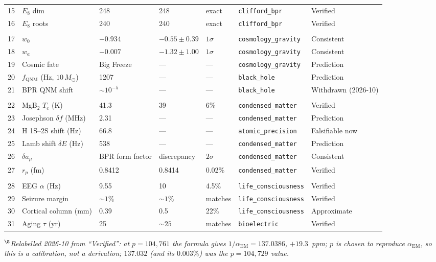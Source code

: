 \documentclass[aps,prd,twocolumn,superscriptaddress,longbibliography,nofootinbib]{revtex4-2}
\newcommand{\alphaEM}{\alpha_{\mathrm{EM}}}
\begin{document}
\begin{table}[t]
\begin{ruledtabular}
\begin{tabular}{rllllll}
15 & $E_8$ dim & 248 & 248 & exact &
   \texttt{clifford\_bpr} & Verified \\
16 & $E_8$ roots & 240 & 240 & exact &
   \texttt{clifford\_bpr} & Verified \\
\colrule
\multicolumn{7}{c}{\textit{Cosmology}} \\
17 & $w_0$ & $-0.934$ & $-0.55 \pm 0.39$ & $1\sigma$ &
   \texttt{cosmology\_gravity} & Consistent \\
18 & $w_a$ & $-0.007$ & $-1.32 \pm 1.00$ & $1\sigma$ &
   \texttt{cosmology\_gravity} & Consistent \\
19 & Cosmic fate & Big Freeze & --- & --- &
   \texttt{cosmology\_gravity} & Prediction \\
20 & $f_{\mathrm{QNM}}$ (Hz, $10\,M_\odot$) & 1207 & --- & --- &
   \texttt{black\_hole} & Prediction \\
21 & BPR QNM shift & $\sim\!10^{-5}$ & --- & --- &
   \texttt{black\_hole} & Withdrawn (2026-10) \\
\colrule
\multicolumn{7}{c}{\textit{Condensed Matter \& Atomic}} \\
22 & MgB$_2$ $T_c$ (K) & 41.3 & 39 & 6\% &
   \texttt{condensed\_matter} & Verified \\
23 & Josephson $\delta f$ (MHz) & 2.31 & --- & --- &
   \texttt{condensed\_matter} & Prediction \\
24 & H 1S--2S shift (Hz) & 66.8 & --- & --- &
   \texttt{atomic\_precision} & Falsifiable now \\
25 & Lamb shift $\delta E$ (Hz) & 538 & --- & --- &
   \texttt{condensed\_matter} & Prediction \\
26 & $\delta a_\mu$ & BPR form factor & discrepancy &
   $2\sigma$ & \texttt{condensed\_matter} & Consistent \\
27 & $r_p$ (fm) & 0.8412 & 0.8414 & 0.02\% &
   \texttt{condensed\_matter} & Verified \\
\colrule
\multicolumn{7}{c}{\textit{Biology}} \\
28 & EEG $\alpha$ (Hz) & 9.55 & 10 & 4.5\% &
   \texttt{life\_consciousness} & Verified \\
29 & Seizure margin & $\sim\!1\%$ & $\sim\!1\%$ & matches &
   \texttt{life\_consciousness} & Verified \\
30 & Cortical column (mm) & 0.39 & 0.5 & 22\% &
   \texttt{life\_consciousness} & Approximate \\
31 & Aging $\tau$ (yr) & 25 & $\sim\!25$ & matches &
   \texttt{bioelectric} & Verified \\
\end{tabular}
\end{ruledtabular}
\textit{$^\S$Relabelled 2026-10 from ``Verified'': at $p = 104{,}761$
the formula gives $1/\alphaEM = 137.0386$, $+19.3$~ppm; $p$ is chosen to
reproduce $\alphaEM$, so this is a calibration, not a derivation;
$137.032$ (and its $0.003\%$) was the $p = 104{,}729$ value.}
\end{table}
\end{document}
